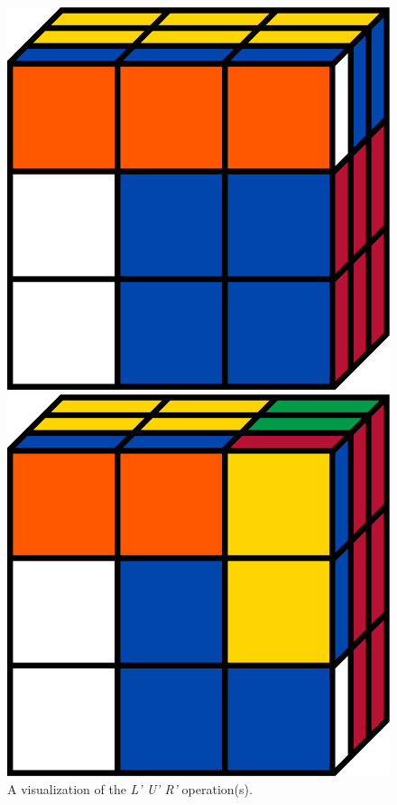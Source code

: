 \documentclass[12pt]{article}
\begin{document}
\begin{figure}[h]
\begin{minipage}[c]{0.2\textwidth}
        \includegraphics[scale=0.1]{cubeLpUp.png}
    \end{minipage}
    \begin{minipage}[c]{0.05\textwidth}
        \centering
    \end{minipage}
    \hspace{0.5cm}
    \begin{minipage}[c]{0.2\textwidth}
        \includegraphics[scale=0.1]{cubeLpUpRp.png}
    \end{minipage}
    \caption{A visualization of the \textit{L' U' R'} operation(s).}
\end{figure}
\end{document}
